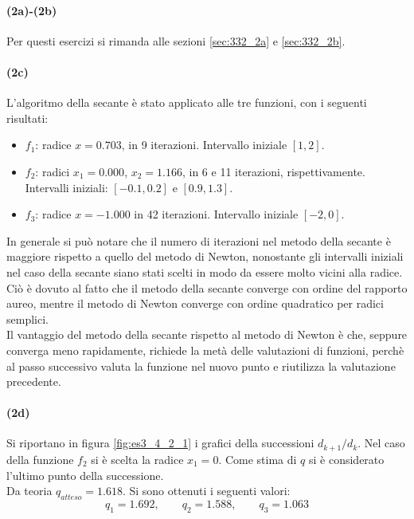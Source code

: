 \documentclass[letterpaper, 12pt]{article}
\numberwithin{equation}{section}    %
\begin{document}
\paragraph{(2a)-(2b)} Per questi esercizi si rimanda alle sezioni \ref{sec:332_2a} e \ref{sec:332_2b}.

\paragraph{(2c)} L'algoritmo della secante è stato applicato alle tre funzioni, con i seguenti risultati:
\begin{itemize}
    \item $f_1$: radice $x = 0.703$, in 9 iterazioni. Intervallo iniziale $[1,2]$.
    \item $f_2$: radici $x_1 = 0.000$, $x_2 = 1.166$, in 6 e 11 iterazioni, rispettivamente. Intervalli iniziali:
    $[-0.1,0.2]$ e $[0.9,1.3]$.
    \item $f_3$: radice $x = -1.000$ in 42 iterazioni. Intervallo iniziale $[-2,0]$.
\end{itemize}

In generale si può notare che il numero di iterazioni nel metodo della secante è maggiore rispetto 
a quello del metodo di Newton, nonostante gli intervalli iniziali nel caso della secante siano stati scelti 
in modo da essere molto vicini alla radice. Ciò è dovuto al fatto che il metodo della secante converge
con ordine del rapporto aureo, mentre il metodo di Newton converge con ordine quadratico per radici semplici. \\
Il vantaggio del metodo della secante rispetto al metodo di Newton è che, seppure converga meno rapidamente,
richiede la metà delle valutazioni di funzioni, perchè al passo successivo valuta la
funzione nel nuovo punto e riutilizza la valutazione precedente.
\paragraph{(2d)}Si riportano in figura
\ref{fig:es3_4_2_1} i grafici della successioni $d_{k+1}/d_{k} $. Nel caso della funzione $f_2$ si 
è scelta la radice $x_1 = 0$. Come stima di $q$ si è considerato l'ultimo punto della successione. \\
Da teoria $q_{atteso} = 1.618$. Si sono ottenuti i seguenti valori:
\begin{equation*}
    q_1 = 1.692,
    \qquad
    q_2 = 1.588,
    \qquad
    q_3 = 1.063
\end{equation*}
\end{document}

